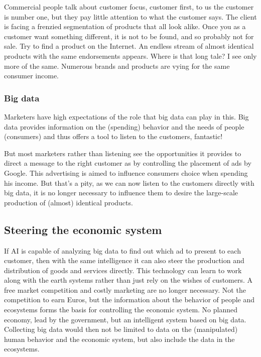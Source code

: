 \documentclass[11pt]{article}
\begin{document}
Commercial people talk about customer focus, customer first, to us the customer is number one, but they pay little attention to what the customer says. The client is facing a frenzied segmentation of products that all look alike. Once you as a customer want something different, it is not to be found, and so probably not for sale. Try to find a product on the Internet. An endless stream of almost identical products with the same endorsements appears. Where is that long tale? I see only more of the same. Numerous brands and products are vying for the same consumer income.

\subsubsection{Big data}
\label{sec:orgeda922c}

Marketers have high expectations of the role that big data can play in this. Big data provides information on the (spending) behavior and the needs of people (consumers) and thus offers a tool to listen to the customers, fantastic!

But most marketers rather than listening see the opportunities it provides to direct a message to the right customer as by controlling the placement of ads by Google. This advertising is aimed to influence consumers choice when spending his income. But that’s a pity, as we can now listen to the customers directly with big data, it is no longer necessary to influence them to desire the large-scale production of (almost) identical products.

\subsection{Steering the economic system}
\label{sec:org38d30ef}

If AI is capable of analyzing big data to find out which ad to present to each customer, then with the same intelligence it can also steer the production and distribution of goods and services directly. This technology can learn to work along with the earth systems rather than just rely on the wishes of customers. A free market competition and costly marketing are no longer necessary. Not the competition to earn Euros, but the information about the behavior of people and ecosystems forms the basis for controlling the economic system. No planned economy, lead by the government, but an intelligent system based on big data. Collecting big data would then not be limited to data on the (manipulated) human behavior and the economic system, but also include the data in the ecosystems.
\end{document}
